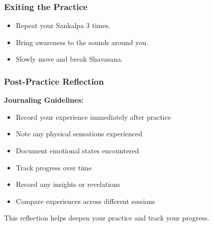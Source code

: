 \begin{frame}[fragile]\frametitle{Exiting the Practice}
    \begin{itemize}
        \item Repeat your Sankalpa 3 times.
        \item Bring awareness to the sounds around you.
        \item Slowly move and break Shavasana.
    \end{itemize}
\end{frame}

\begin{frame}[fragile]\frametitle{Post-Practice Reflection}
    \textbf{Journaling Guidelines:}
    \begin{itemize}
        \item Record your experience immediately after practice
        \item Note any physical sensations experienced
        \item Document emotional states encountered
        \item Track progress over time
        \item Record any insights or revelations
        \item Compare experiences across different sessions
    \end{itemize}
    \small{This reflection helps deepen your practice and track your progress.}
\end{frame}
